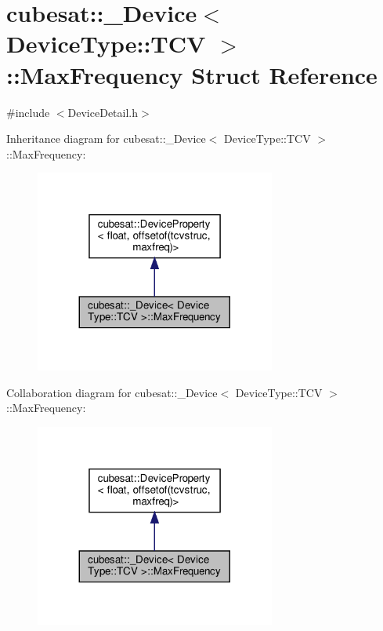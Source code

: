 \hypertarget{structcubesat_1_1__Device_3_01DeviceType_1_1TCV_01_4_1_1MaxFrequency}{}\section{cubesat\+:\+:\+\_\+\+Device$<$ Device\+Type\+:\+:T\+CV $>$\+:\+:Max\+Frequency Struct Reference}
\label{structcubesat_1_1__Device_3_01DeviceType_1_1TCV_01_4_1_1MaxFrequency}


{\ttfamily \#include $<$Device\+Detail.\+h$>$}



Inheritance diagram for cubesat\+:\+:\+\_\+\+Device$<$ Device\+Type\+:\+:T\+CV $>$\+:\+:Max\+Frequency\+:\nopagebreak
\begin{figure}[H]
\begin{center}
\leavevmode
\includegraphics[width=224pt]{structcubesat_1_1__Device_3_01DeviceType_1_1TCV_01_4_1_1MaxFrequency__inherit__graph}
\end{center}
\end{figure}


Collaboration diagram for cubesat\+:\+:\+\_\+\+Device$<$ Device\+Type\+:\+:T\+CV $>$\+:\+:Max\+Frequency\+:\nopagebreak
\begin{figure}[H]
\begin{center}
\leavevmode
\includegraphics[width=224pt]{structcubesat_1_1__Device_3_01DeviceType_1_1TCV_01_4_1_1MaxFrequency__coll__graph}
\end{center}
\end{figure}

